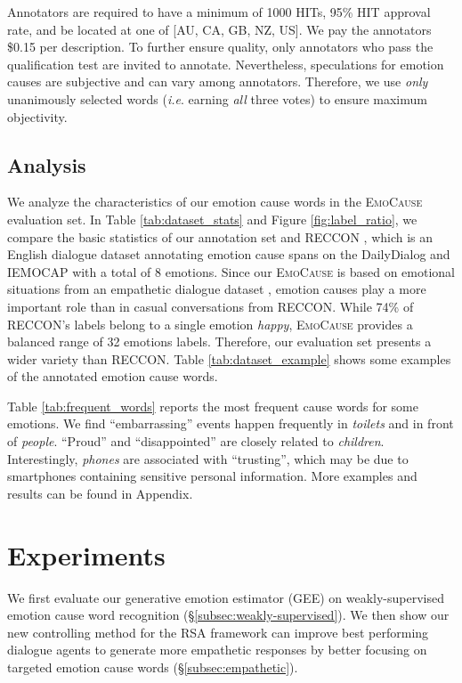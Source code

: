 \documentclass[11pt]{article}
\makeatletter
\DeclareRobustCommand\onedot{\futurelet\@let@token\@onedot}
\def\onedot{. }
\def\ie{\emph{i.e}\onedot} \def\Ie{\emph{I.e}\onedot}
\makeatother
\begin{document}
Annotators are required to have a minimum of 1000 HITs, 95\% HIT approval rate, and be located at one of [AU, CA, GB, NZ, US].
We pay the annotators \$0.15 per description.
To further ensure quality, only annotators who pass the qualification test are invited to annotate.
Nevertheless, speculations for emotion causes are subjective and can vary among annotators.
Therefore, we use \textit{only} unanimously selected words (\ie earning \textit{all} three votes) to ensure maximum objectivity.


\subsection{Analysis}

We analyze the characteristics of our emotion cause words in the \textsc{EmoCause} evaluation set.
In Table \ref{tab:dataset_stats} and Figure \ref{fig:label_ratio}, we compare the basic statistics of our annotation set and RECCON \citep{Poria:2020:arxiv}, which is an English dialogue dataset annotating emotion cause spans on the DailyDialog \citep{Li:2017:IJCNLP} and IEMOCAP \citep{Busso:2008:LREC} with a total of 8 emotions. Since our \textsc{EmoCause} is based on emotional situations from an empathetic dialogue dataset \citep{Rashkin:2019:ACL}, emotion causes play a more important role than in casual conversations from RECCON.
While 74\% of RECCON's labels belong to a single emotion \textit{happy}, \textsc{EmoCause} provides a balanced range of 32 emotions labels.
Therefore, our evaluation set presents a wider variety than RECCON.
Table \ref{tab:dataset_example} shows some examples of the annotated emotion cause words.


Table \ref{tab:frequent_words} reports the most frequent cause words for some emotions.
We find ``embarrassing'' events happen frequently in \textit{toilets} and in front of \textit{people}.
``Proud''  and ``disappointed'' are closely related to \textit{children}.
Interestingly, \textit{phones} are associated with ``trusting'', which may be due to smartphones containing sensitive personal information. More examples and results can be found in Appendix.









\section{Experiments}
\label{sec:experiments}
We first evaluate our generative emotion estimator (GEE) on weakly-supervised emotion cause word recognition (\S \ref{subsec:weakly-supervised}).
We then show our new controlling method for the RSA framework can improve best performing dialogue agents to generate more empathetic responses by better focusing on targeted emotion cause words (\S \ref{subsec:empathetic}). 
\end{document}
